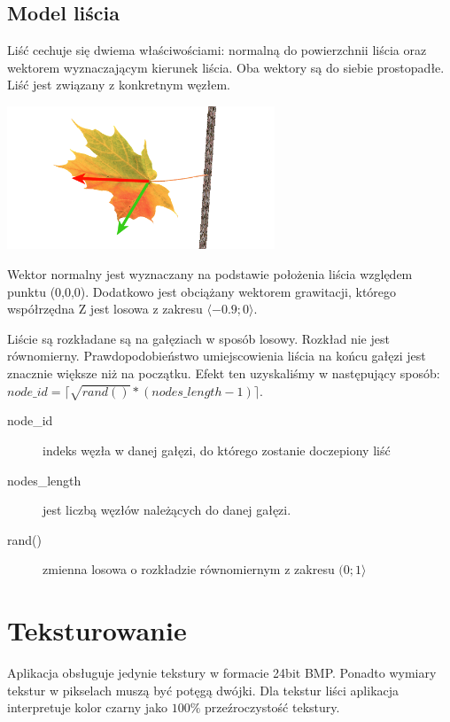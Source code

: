 \subsection{Model liścia}
Liść cechuje się dwiema właściwościami: normalną do powierzchnii liścia oraz wektorem wyznaczającym kierunek liścia. Oba wektory są do siebie prostopadłe. Liść jest związany z konkretnym węzłem.

\begin{center}
	\includegraphics[width=80mm]{images/model/leaf_vects.png}
	\label{leaf_vect}
\end{center}

Wektor normalny jest wyznaczany na podstawie położenia liścia względem punktu (0,0,0). Dodatkowo jest obciążany wektorem grawitacji, którego współrzędna Z jest losowa z zakresu $\langle-0.9;0\rangle$. 



Liście są rozkładane są na gałęziach w sposób losowy. Rozkład nie jest równomierny. Prawdopodobieństwo umiejscowienia liścia na końcu gałęzi jest znacznie większe niż na początku. Efekt ten uzyskaliśmy w następujący sposób: $node\_id = \lceil\sqrt{rand()}*(nodes\_length-1)\rceil$.

\begin{description}
	\item[node\_id] indeks węzła w danej gałęzi, do którego zostanie doczepiony liść
	\item[nodes\_length] jest liczbą węzłów należących do danej gałęzi.
	\item[rand()] zmienna losowa o rozkładzie równomiernym z zakresu $(0;1\rangle$
\end{description}

\section{Teksturowanie}
Aplikacja obsługuje jedynie tekstury w formacie 24bit BMP. 
Ponadto wymiary tekstur w pikselach muszą być potęgą dwójki.
Dla tekstur liści aplikacja interpretuje kolor czarny jako ${100\%}$ przeźroczystość tekstury.

